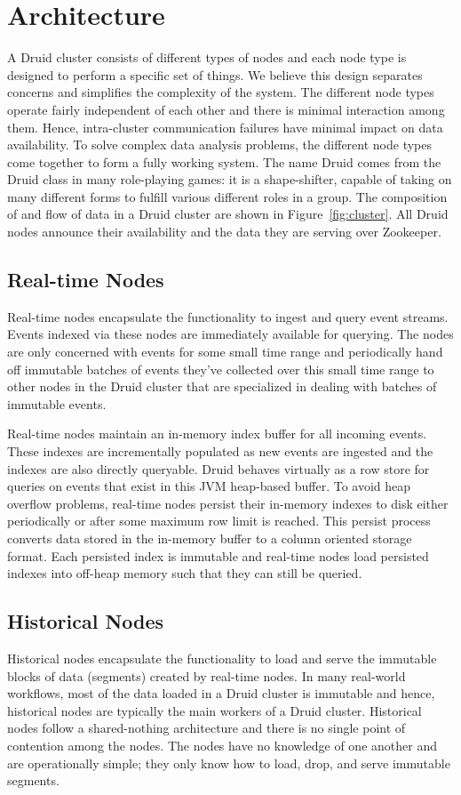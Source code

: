 \documentclass{vldb}
\begin{document}
\section{Architecture}
A Druid cluster consists of different types of nodes and each node type is
designed to perform a specific set of things. We believe this design separates
concerns and simplifies the complexity of the system. The different node types
operate fairly independent of each other and there is minimal interaction among
them. Hence, intra-cluster communication failures have minimal impact on data
availability.  To solve complex data analysis problems, the different node
types come together to form a fully working system.  The name Druid comes from
the Druid class in many role-playing games: it is a shape-shifter, capable of
taking on many different forms to fulfill various different roles in a group.
The composition of and flow of data in a Druid cluster are shown in
Figure~\ref{fig:cluster}. All Druid nodes announce their availability and the
data they are serving over Zookeeper\cite{hunt2010zookeeper}.

\subsection{Real-time Nodes}
Real-time nodes encapsulate the functionality to ingest and query event
streams. Events indexed via these nodes are immediately available for querying.
The nodes are only concerned with events for some small time range and
periodically hand off immutable batches of events they've collected over this
small time range to other nodes in the Druid cluster that are specialized in
dealing with batches of immutable events. 

Real-time nodes maintain an in-memory index buffer for all incoming events.
These indexes are incrementally populated as new events are ingested and the
indexes are also directly queryable.  Druid behaves virtually as a row store
for queries on events that exist in this JVM heap-based buffer. To avoid heap
overflow problems, real-time nodes persist their in-memory indexes to disk
either periodically or after some maximum row limit is reached. This persist
process converts data stored in the in-memory buffer to a column oriented
storage format. Each persisted index is immutable and real-time nodes load
persisted indexes into off-heap memory such that they can still be queried. 

\subsection{Historical Nodes}
Historical nodes encapsulate the functionality to load and serve the immutable
blocks of data (segments) created by real-time nodes. In many real-world
workflows, most of the data loaded in a Druid cluster is immutable and hence,
historical nodes are typically the main workers of a Druid cluster.  Historical
nodes follow a shared-nothing architecture and there is no single point of
contention among the nodes. The nodes have no knowledge of one another and are
operationally simple; they only know how to load, drop, and serve immutable
segments.
\end{document}
